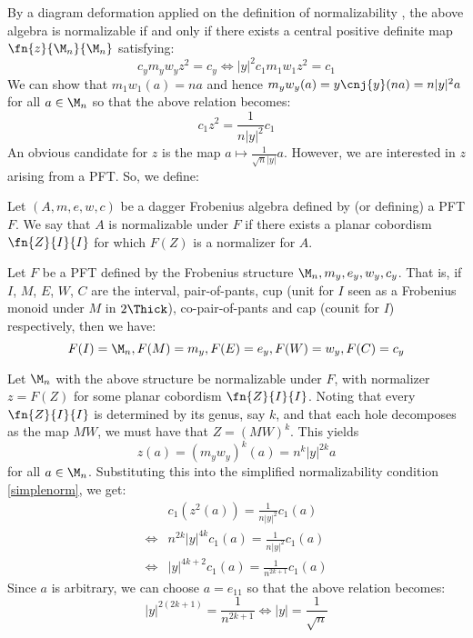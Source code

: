 By a diagram deformation applied on the definition of normalizability
\cite[9]{CatQChan}, the above algebra is normalizable if and only if there
exists a central positive definite map $\fn{z}{\M_n}{\M_n}$ satisfying:
\[
  c_ym_yw_yz^2 = c_y \iff |y|^2c_1m_1w_1z^2 = c_1
\]
We can show that $m_1w_1(a) = na$ and hence $m_yw_y(a) = y\cnj{y} (na)
= n|y|^2 a$ for all $a \in \M_n$ so that the above relation becomes:
\begin{equation}\label{simplenorm}
  c_1z^2 = \frac{1}{n|y|^2}c_1
\end{equation}
An obvious candidate for $z$ is the map $a \mapsto \frac{1}{\sqrt{n}|y|} a$.
However, we are interested in $z$ arising from a PFT. So, we define:
\begin{defn}
Let $(A, m, e, w, c)$ be a dagger Frobenius algebra defined by (or defining) a
PFT $F$. We say that $A$ is normalizable under $F$ if there exists a planar
cobordism $\fn{Z}{I}{I}$ for which $F(Z)$ is a normalizer for $A$.
\end{defn}

Let $F$ be a PFT defined by the Frobenius structure $\M_n, m_y, e_y, w_y, c_y$.
That is, if $I$, $M$, $E$, $W$, $C$ are the interval, pair-of-pants, cup (unit
for $I$ seen as a Frobenius monoid under $M$ in $2\Thick$), co-pair-of-pants and
cap (counit for $I$) respectively, then we have:
\[
  F(I) = \M_n, F(M) = m_y, F(E) = e_y, F(W) = w_y, F(C) = c_y
\]

Let $\M_{n}$ with the above structure be normalizable under $F$, with normalizer
$z = F(Z)$ for some planar cobordism $\fn{Z}{I}{I}$. Noting that every
$\fn{Z}{I}{I}$ is determined by its genus, say $k$, and that each hole
decomposes as the map $MW$, we must have that $Z = (MW)^k$. This yields
\[
  z(a) = (m_yw_y)^k(a) = n^{k}|y|^{2k}a
\]
for all $a \in \M_n$. Substituting this into the simplified normalizability
condition \eqref{simplenorm}, we get:
\begin{align*}
       & c_1(z^2(a)) = \frac{1}{n|y|^2} c_1(a)\\
  \iff & n^{2k}|y|^{4k} c_1(a) = \frac{1}{n|y|^2} c_1(a)\\
  \iff & |y|^{4k + 2}c_1(a) = \frac{1}{n^{2k + 1}} c_1(a)
\end{align*}
Since $a$ is arbitrary, we can choose $a = e_{11}$ so that the above relation
becomes:
\[
  |y|^{2(2k + 1)} = \frac{1}{n^{2k + 1}}
  \iff |y| = \frac{1}{\sqrt{n}}
\]

